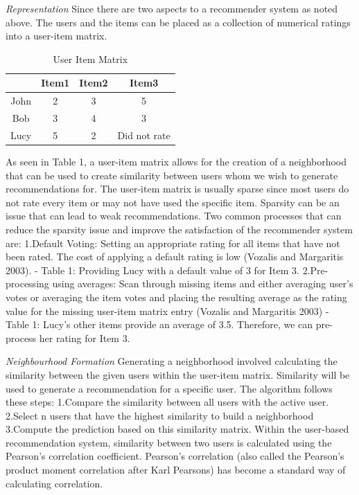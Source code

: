 \textit{Representation}
Since there are two aspects to a recommender system as noted above. The users and the items can be placed as a collection of numerical ratings into a user-item matrix.\\
\begin{table}[ht]
\caption{User Item Matrix} %
\centering  %
\begin{tabular}{c c c c} %
\hline\hline                        %
 & Item1 & Item2& Item3 \\ [0.5ex] %
\hline                  %

John & 2 & 3  & 5  \\
Bob & 3 & 4 & 3 \\
Lucy & 5 & 2& Did not rate \\[1ex]      %
\hline %
\end{tabular}
\label{table:3} %
\end{table}

As seen in Table 1, a user-item matrix allows for the creation of a neighborhood that can be used to create similarity between users whom we wish to generate recommendations for. The user-item matrix is usually sparse since most users do not rate every item or may not have used the specific item.
Sparsity can be an issue that can lead to weak recommendations. Two common processes that can reduce the sparsity issue and improve the satisfaction of the recommender system are:
1.Default Voting: Setting an appropriate rating for all items that have not been rated. The cost of applying a default rating is low (Vozalis and Margaritis 2003).   - Table 1: Providing Lucy with a default value of 3 for Item 3.
2.Pre-processing using averages: Scan through missing items and either averaging user’s votes or averaging the item votes and placing the resulting average as the rating value for the missing user-item matrix entry (Vozalis and Margaritis 2003)    - Table 1: Lucy’s other items provide an average of 3.5. Therefore, we can pre-process her rating for Item 3.

\textit{Neighbourhood Formation}
Generating a neighborhood involved calculating the similarity between the given users within the user-item matrix. Similarity will be used to generate a recommendation for a specific user.
The algorithm follows these steps:
1.Compare the similarity between all users with the active user.
2.Select n users that have the highest similarity to build a neighborhood
3.Compute the prediction based on this similarity matrix.
Within the user-based recommendation system, similarity between two users is calculated using the Pearson’s correlation coefficient. Pearson’s correlation (also called the Pearson's product moment correlation after Karl Pearsons) has become a standard way of calculating correlation.

